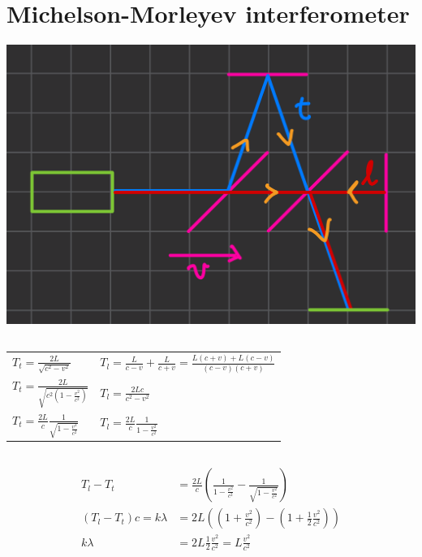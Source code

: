 \documentclass[a4paper,12pt]{article}
\begin{document}
\section{Michelson-Morleyev interferometer}
\includegraphics[width=\textwidth]{michelson.png}
\subsection{}
\begin{table}[h!]
    \centering
    \begin{tabularx}{\textwidth}{YY}
        $T_t = \frac{2L}{\sqrt{c^2 - v^2}}$                       & $T_l = \frac{L}{c-v} + \frac{L}{c+v} = \frac{L(c+v) + L(c-v)}{(c-v)(c+v)}$ \\
        $T_t = \frac{2L}{\sqrt{c^2 (1 - \frac{v^2}{c^2})}}$       & $T_l = \frac{2L c}{c^2 - v^2}$                                             \\
        $T_t = \frac{2L}{c} \frac{1}{\sqrt{1 - \frac{v^2}{c^2}}}$ & $T_l = \frac{2L}{c} \frac{1}{1- \frac{v^2}{c^2}}$                          \\
    \end{tabularx}
\end{table}

\subsection{}
\begin{align}
    T_l - T_t & = \frac{2L}{c} \left( \frac{1}{1 - \frac{v^2}{c^2}} - \frac{1}{\sqrt{1 - \frac{v^2}{c^2}}} \right) \\
    (T_l - T_t) c = k \lambda & = 2L \left( (1 + \frac{v^2}{c^2}) - (1 + \frac 1 2 \frac{v^2}{c^2}) \right) \\
    k \lambda & = 2L \frac{1}{2} \frac{v^2}{c^2} = L \frac{v^2}{c^2}
\end{align}
\end{document}
